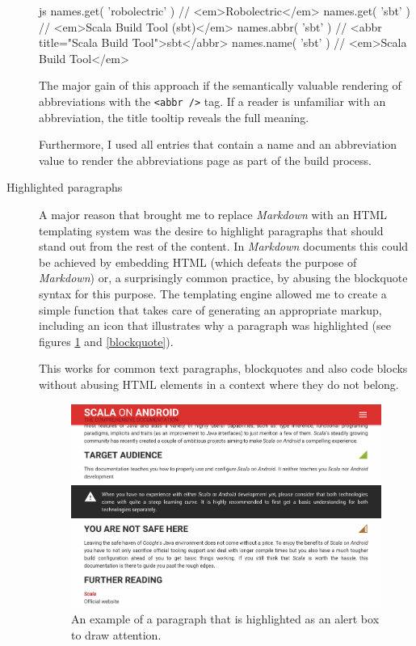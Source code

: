 \begin{description}
	\begin{code}{js}
names.get( 'robolectric' ) // <em>Robolectric</em>
names.get( 'sbt' ) // <em>Scala Build Tool (sbt)</em>
names.abbr( 'sbt' ) // <abbr title="Scala Build Tool">sbt</abbr>
names.name( 'sbt' ) // <em>Scala Build Tool</em>
	\end{code}

	The major gain of this approach if the semantically valuable rendering of abbreviations with the \texttt{<abbr />} tag. If a reader is unfamiliar with an abbreviation, the title tooltip reveals the full meaning.

	Furthermore, I used all entries that contain a name and an abbreviation value to render the abbreviations page as part of the build process.

	\item[Highlighted paragraphs]\hfill

	A major reason that brought me to replace \textit{Markdown} with an \ac{HTML} templating system was the desire to highlight paragraphs that should stand out from the rest of the content. In \textit{Markdown} documents this could be achieved by embedding \ac{HTML} (which defeats the purpose of \textit{Markdown}) or, a surprisingly common practice, by abusing the blockquote syntax for this purpose. The templating engine allowed me to create a simple function that takes care of generating an appropriate markup, including an icon that illustrates why a paragraph was highlighted (see figures \ref{alert} and \ref{blockquote}).

	\begin{code}{html}
{%
	<p>Lorem Ipsum</p>
{%
	\end{code}

	This works for common text paragraphs, blockquotes and also code blocks without abusing \ac{HTML} elements in a context where they do not belong.

	\begin{figure}[]
		\includegraphics[width=\textwidth]{asset/alert.png}
		\caption{An example of a paragraph that is highlighted as an alert box to draw attention.}
		\label{alert}
	\end{figure}


\end{description}
